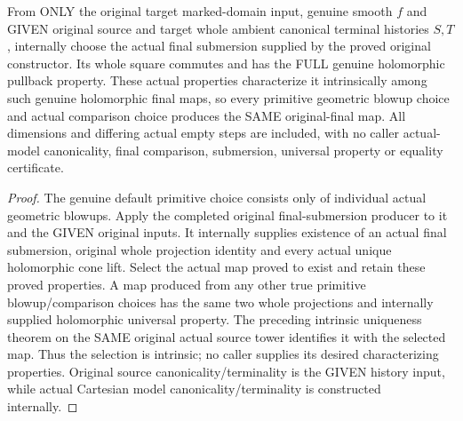 \begin{definition}
\label{hir:smooth-original-finite-terminal-intrinsic-smooth-map}
\leanok
{}
From ONLY the original target marked-domain input, genuine smooth $f$ and
GIVEN original source and target whole ambient canonical terminal histories
$S,T$, internally choose the actual final submersion supplied by the
proved original constructor. Its whole square commutes and has the FULL
genuine holomorphic pullback property. These actual properties characterize
it intrinsically among such genuine holomorphic final maps, so every
primitive geometric blowup choice and actual comparison choice produces
the SAME original-final map. All dimensions and differing actual empty
steps are included, with no caller actual-model canonicality, final
comparison, submersion, universal property or equality certificate.
\end{definition}
\begin{proof}
The genuine default primitive choice consists only of individual actual
geometric blowups. Apply the completed original final-submersion producer
to it and the GIVEN original inputs. It internally supplies existence of
an actual final submersion, original whole projection identity and every
actual unique holomorphic cone lift. Select the actual map proved to
exist and retain these proved properties. A map produced from any other
true primitive blowup/comparison choices has the same two whole projections
and internally supplied holomorphic universal property. The preceding
intrinsic uniqueness theorem on the SAME original actual source tower
identifies it with the selected map. Thus the selection is intrinsic;
no caller supplies its desired characterizing properties. Original
source canonicality/terminality is the GIVEN history input, while actual
Cartesian model canonicality/terminality is constructed internally.
\end{proof}

